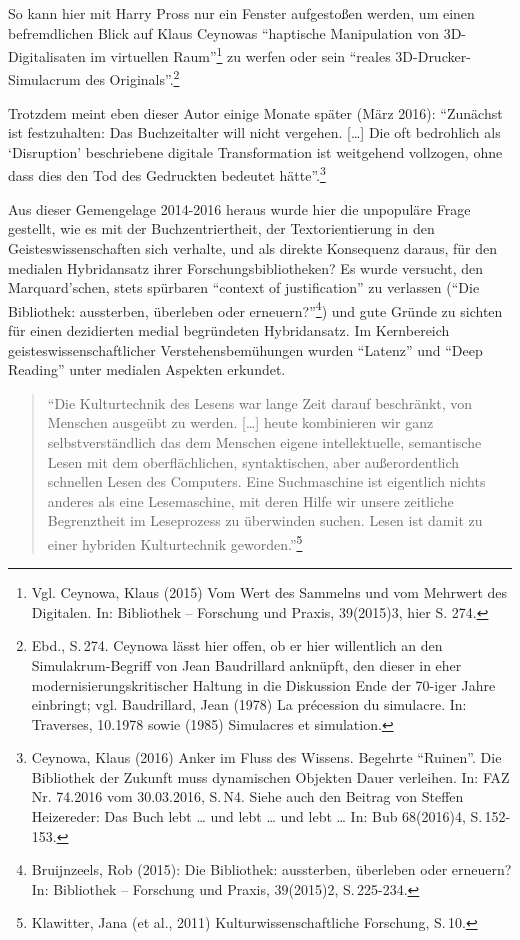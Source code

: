 \documentclass[a4paper,
fontsize=11pt,
oneside,
numbers=noperiodatend,
parskip=half-,
bibliography=totoc,
final
]{scrartcl}
\begin{document}
So kann hier mit Harry Pross nur ein Fenster aufgestoßen werden, um
einen befremdlichen Blick auf Klaus Ceynowas \enquote{haptische
Manipulation von 3D-Digitalisaten im virtuellen Raum}\footnote{Vgl.
  Ceynowa, Klaus (2015) Vom Wert des Sammelns und vom Mehrwert des
  Digitalen. In: Bibliothek -- Forschung und Praxis, 39(2015)3, hier S.
  274.} zu werfen oder sein \enquote{reales 3D-Drucker-Simulacrum des
Originals}.\footnote{Ebd., S.\,274. Ceynowa lässt hier offen, ob er hier
  willentlich an den Simulakrum-Begriff von Jean Baudrillard anknüpft,
  den dieser in eher modernisierungskritischer Haltung in die Diskussion
  Ende der 70-iger Jahre einbringt; vgl. Baudrillard, Jean (1978) La
  précession du simulacre. In: Traverses, 10.1978 sowie (1985)
  Simulacres et simulation.}

Trotzdem meint eben dieser Autor einige Monate später (März 2016):
\enquote{Zunächst ist festzuhalten: Das Buchzeitalter will nicht
vergehen. {[}\ldots{}{]} Die oft bedrohlich als \enquote{Disruption}
beschriebene digitale Transformation ist weitgehend vollzogen, ohne dass
dies den Tod des Gedruckten bedeutet hätte}.\footnote{Ceynowa, Klaus
  (2016) Anker im Fluss des Wissens. Begehrte \enquote{Ruinen}. Die
  Bibliothek der Zukunft muss dynamischen Objekten Dauer verleihen. In:
  FAZ Nr. 74.2016 vom 30.03.2016, S.\,N4. Siehe auch den Beitrag von
  Steffen Heizereder: Das Buch lebt \ldots{} und lebt \ldots{} und lebt
  \ldots{} In: Bub 68(2016)4, S.\,152-153.}

Aus dieser Gemengelage 2014-2016 heraus wurde hier die unpopuläre Frage
gestellt, wie es mit der Buchzentriertheit, der Textorientierung in den
Geisteswissenschaften sich verhalte, und als direkte Konsequenz daraus,
für den medialen Hybridansatz ihrer Forschungsbibliotheken? Es wurde
versucht, den Marquard'schen, stets spürbaren \enquote{context of
justification} zu verlassen (\enquote{Die Bibliothek: aussterben,
überleben oder erneuern?}\footnote{Bruijnzeels, Rob (2015): Die
  Bibliothek: aussterben, überleben oder erneuern? In: Bibliothek --
  Forschung und Praxis, 39(2015)2, S.\,225-234.}) und gute Gründe zu
sichten für einen dezidierten medial begründeten Hybridansatz. Im
Kernbereich geisteswissenschaftlicher Verstehensbemühungen wurden
\enquote{Latenz} und \enquote{Deep Reading} unter medialen Aspekten
erkundet.

\begin{quote}
\enquote{Die Kulturtechnik des Lesens war lange Zeit darauf beschränkt,
von Menschen ausgeübt zu werden. {[}\ldots{}{]} heute kombinieren wir
ganz selbstverständlich das dem Menschen eigene intellektuelle,
semantische Lesen mit dem oberflächlichen, syntaktischen, aber
außerordentlich schnellen Lesen des Computers. Eine Suchmaschine ist
eigentlich nichts anderes als eine Lesemaschine, mit deren Hilfe wir
unsere zeitliche Begrenztheit im Leseprozess zu überwinden suchen. Lesen
ist damit zu einer hybriden Kulturtechnik geworden.}\footnote{Klawitter,
  Jana (et al., 2011) Kulturwissenschaftliche Forschung, S.\,10.}
\end{quote}
\end{document}
